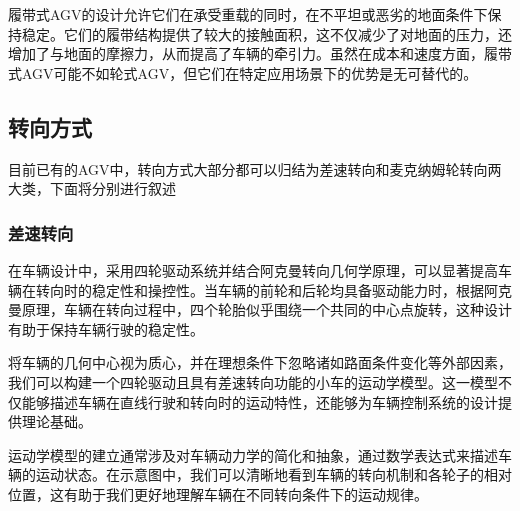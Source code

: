 \documentclass{report}
\begin{document}
履带式AGV的设计允许它们在承受重载的同时，在不平坦或恶劣的地面条件下保持稳定。它们的履带结构提供了较大的接触面积，这不仅减少了对地面的压力，还增加了与地面的摩擦力，从而提高了车辆的牵引力。虽然在成本和速度方面，履带式AGV可能不如轮式AGV，但它们在特定应用场景下的优势是无可替代的。

\newpage
\subsection{转向方式}
\label{subsec:label}
目前已有的AGV中，转向方式大部分都可以归结为差速转向和麦克纳姆轮转向两大类，下面将分别进行叙述
\subsubsection{差速转向\cite{chasu}}
\label{subsec:label}
在车辆设计中，采用四轮驱动系统并结合阿克曼转向几何学原理，可以显著提高车辆在转向时的稳定性和操控性。当车辆的前轮和后轮均具备驱动能力时，根据阿克曼原理，车辆在转向过程中，四个轮胎似乎围绕一个共同的中心点旋转，这种设计有助于保持车辆行驶的稳定性。

将车辆的几何中心视为质心，并在理想条件下忽略诸如路面条件变化等外部因素，我们可以构建一个四轮驱动且具有差速转向功能的小车的运动学模型。这一模型不仅能够描述车辆在直线行驶和转向时的运动特性，还能够为车辆控制系统的设计提供理论基础。

运动学模型的建立通常涉及对车辆动力学的简化和抽象，通过数学表达式来描述车辆的运动状态。在示意图中，我们可以清晰地看到车辆的转向机制和各轮子的相对位置，这有助于我们更好地理解车辆在不同转向条件下的运动规律。
\end{document}
